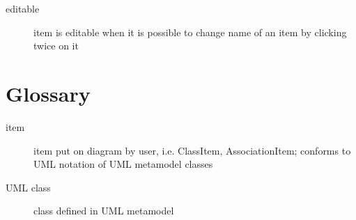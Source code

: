 \documentclass{article}
\begin{document}
\begin{description}
\item[editable] item is editable when it is possible to change name of an
    item by clicking twice on it
\end{description}


\section{Glossary}

\begin{description}
\item[item]
    item put on diagram by user, i.e. ClassItem, AssociationItem;
    conforms to UML notation of UML metamodel classes

\item[UML class]
    class defined in UML metamodel
\end{description}
\end{document}
